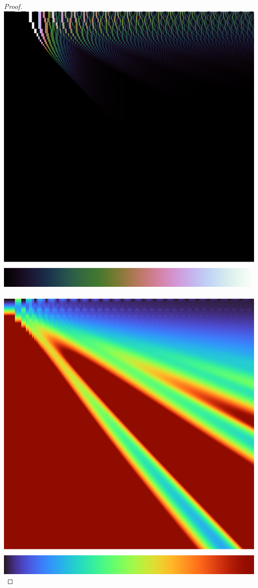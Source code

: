 \documentclass[]{article}
\begin{document}
\begin{proof}
	\vspace{0.3cm}
	
	\includegraphics[scale=0.3]{variance.png}\,\includegraphics[scale=0.3]{e-bias.png}
	

\end{proof}
\end{document}
